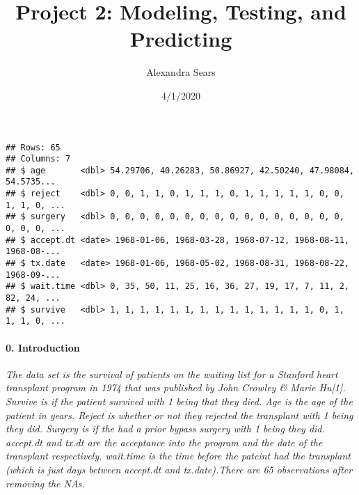 \documentclass[]{article}
\title{Project 2: Modeling, Testing, and Predicting}
\author{Alexandra Sears}
\date{4/1/2020}
\newenvironment{Shaded}{\begin{snugshade}}{\end{snugshade}}
\newcommand{\DataTypeTok}[1]{\textcolor[rgb]{0.13,0.29,0.53}{#1}}
\newcommand{\KeywordTok}[1]{\textcolor[rgb]{0.13,0.29,0.53}{\textbf{#1}}}
\newcommand{\NormalTok}[1]{#1}
\newcommand{\OperatorTok}[1]{\textcolor[rgb]{0.81,0.36,0.00}{\textbf{#1}}}
\newcommand{\StringTok}[1]{\textcolor[rgb]{0.31,0.60,0.02}{#1}}
\let\oldparagraph\paragraph
\renewcommand{\paragraph}[1]{\oldparagraph{#1}\mbox{}}
\begin{document}
\maketitle

\begin{Shaded}
\end{Shaded}

\begin{verbatim}
## Rows: 65
## Columns: 7
## $ age       <dbl> 54.29706, 40.26283, 50.86927, 42.50240, 47.98084, 54.5735...
## $ reject    <dbl> 0, 0, 1, 1, 0, 1, 1, 1, 0, 1, 1, 1, 1, 1, 0, 0, 1, 1, 0, ...
## $ surgery   <dbl> 0, 0, 0, 0, 0, 0, 0, 0, 0, 0, 0, 0, 0, 0, 0, 0, 0, 0, 0, ...
## $ accept.dt <date> 1968-01-06, 1968-03-28, 1968-07-12, 1968-08-11, 1968-08-...
## $ tx.date   <date> 1968-01-06, 1968-05-02, 1968-08-31, 1968-08-22, 1968-09-...
## $ wait.time <dbl> 0, 35, 50, 11, 25, 16, 36, 27, 19, 17, 7, 11, 2, 82, 24, ...
## $ survive   <dbl> 1, 1, 1, 1, 1, 1, 1, 1, 1, 1, 1, 1, 1, 1, 0, 1, 1, 1, 0, ...
\end{verbatim}

\hypertarget{introduction}{%
\paragraph{0. Introduction}\label{introduction}}

\emph{The data set is the survival of patients on the waiting list for a
Stanford heart transplant program in 1974 that was published by John
Crowley \& Marie Hu{[}1{]}. Survive is if the patient survived with 1
being that they died. Age is the age of the patient in years. Reject is
whether or not they rejected the transplant with 1 being they did.
Surgery is if the had a prior bypass surgery with 1 being they did.
accept.dt and tx.dt are the acceptance into the program and the date of
the transplant respectively. wait.time is the time before the pateint
had the transplant (which is just days between accept.dt and
tx.date).There are 65 observations after removing the NAs.}
\end{document}
